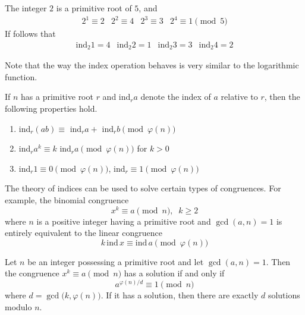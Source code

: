 \documentclass{article}
\newcounter{theorem}[section]
\newcounter{example}[section]
\begin{document}
\begin{example}
  \label{ex:index-table-modulo-5}
The integer $2$ is a primitive root of $5$, and 
\begin{equation}
  \begin{array}{cccc}
      2^1 \equiv 2 & 2^2 \equiv 4 & 2^3 \equiv 3 & 2^4 \equiv 1 \pmod{5}
  \end{array}
\end{equation}
If follows that 
\begin{equation}
  \begin{array}{cccc}
      \text{ind}_2 1 = 4 & \text{ind}_2 2 = 1 & \text{ind}_2 3 = 3 & \text{ind}_2 4 = 2
  \end{array}
\end{equation}
\end{example}
Note that the way the index operation behaves is very similar to the logarithmic function. 

\begin{theorem}
  \label{thm:logarithmic-properties-of-the-index}
If $n$ has a primitive root $r$ and ind$_r a$ denote the index of $a$ relative to $r$, then the following properties hold. 
\begin{enumerate}
    \item ind$_r (a b) \equiv$ ind$_r a + $ ind$_r b \pmod{\varphi(n)}$
    \item ind$_r a^k \equiv k$ ind$_r a \pmod{\varphi(n)}$ for $k>0$ 
    \item ind$_r 1 \equiv 0 \pmod{\varphi(n)}$, ind$_r \equiv 1 \pmod{\varphi(n)}$
\end{enumerate}
\end{theorem}

The theory of indices can be used to solve certain types of congruences. For example, the binomial congruence
\begin{equation}
  x^k \equiv a \pmod{n}, \;\; k \geq 2
\end{equation}
where $n$ is a positive integer having a primitive root and $\gcd(a, n) = 1$ is entirely equivalent to the linear congruence 
\begin{equation}
  k \,\text{ind} \, x \equiv \text{ind} \, a \pmod{\varphi(n)}
\end{equation}

\begin{theorem}
  \label{thm:solvability-of-xkequiva-modulo-an-integer-with}
Let $n$ be an integer possessing a primitive root and let $\gcd(a, n) = 1$. Then the congruence $x^k \equiv a \pmod{n}$ has a solution if and only if 
\begin{equation}
  a^{\varphi(n)/d} \equiv 1 \pmod{n}
\end{equation}
where $d = \gcd\big(k, \varphi(n)\big)$. If it has a solution, then there are exactly $d$ solutions modulo $n$. 
\end{theorem}
\end{document}
